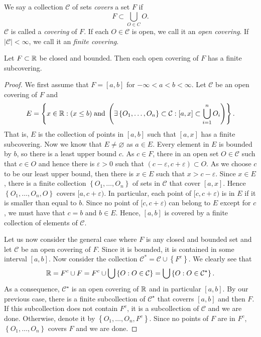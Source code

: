 \begin{definition}[]
	We say a collection $\mathcal C$ of sets \emph{covers} a set $F$ if
	\[
		F \subset \bigcup_{O \in C} O.
	\]
	$\mathcal C$ is called a \emph{covering} of $F$.
	If each $O \in \mathcal C$ is open, we call it an \emph{open covering}.
	If $\left\lvert \mathcal C \right\rvert < \infty$, we call it an 
	\emph{finite covering}.
\end{definition}

\begin{theorem}
	Let $F \subset \mathbb{R}$ be closed and bounded.
	Then each open covering of $F$ has a finite subcovering.
\end{theorem}

\begin{proof}
	We first assume that $F = [a,b]$
	for $-\infty < a < b < \infty$.
	Let $\mathcal C$ be an open covering of $F$ and
	\[
		E = \left\{
			x \in \mathbb{R}:
			(x \leq b)
			\;\text{and}\;
			\left(\exists\left\{ O_1, \ldots, O_n \right\} \subset \mathcal C:
			[a,x] \subset \bigcup_{i=1}^n O_i\right)
		\right\}.
	\]
	That is, $E$ is the collection of points in $[a,b]$
	such that $[a,x]$ has a finite subcovering.
	Now we know that $E \neq \varnothing$ as $a \in E$.
	Every element in $E$ is bounded by $b$, so there is a least
	upper bound $c$.
	As $c \in F$, there in an open set $O \in \mathcal C$ such that $c \in O$
	and hence there is $\varepsilon > 0$ such that 
	$(c - \varepsilon, c + \varepsilon) \subset O$.
	As we choose $c$ to be our least upper bound, then there is $x \in E$
	such that $x > c - \varepsilon$.
	Since $x \in E$, there is a finite collection
	$ \left\{ O_1, \ldots, O_n \right\} $
	of sets in $\mathcal C$ that cover $[a,x]$.
	Hence
	$ \left\{ O_1, \ldots, O_n, O \right\} $
	covers $[a, c + \varepsilon)$.
	In particular, each point of $[c, c + \varepsilon)$
	is in $E$ if it is smaller than equal to $b$. 
	Since no point of $[c, c + \varepsilon)$ can belong to $E$
	except for $c$, we must have that $c = b$ and $b \in E$.
	Hence, $[a,b]$ is covered by a finite collection of elements of 
	$\mathcal C$.

	Let us now consider the general case where $F$ is any
	closed and bounded set and let $\mathcal C$ be an open covering of $F$.
	Since it is bounded, it is contained in some interval $[a,b]$.
	Now consider the collection 
	$\mathcal C^* = \mathcal C \cup \left\{ F^c \right\}$.
	We clearly see that
	\[
		\mathbb{R} 
		= F^c \cup F 
		= F^c \cup \bigcup \left\{ O: O \in \mathcal C \right\}
		= \bigcup \left\{ O : O \in \mathcal C^\star \right\}.
	\]
	As a consequence, $\mathcal C^\star$ is an open covering of $\mathbb{R}$
	and in particular $[a,b]$.
	By our previous case, there is a finite subcollection of $\mathcal C^\star$
	that coverrs $[a,b]$ and then $F$.
	If this subcollection does not contain $F^c$, it is a subcollection of 
	$\mathcal C$ and we are done.
	Otherwise, denote it by 
	$ \left\{ O_1, \ldots, O_n, F^c \right\} $.
	Since no points of $F$ are in $F^c$, 
	$ \left\{ O_1, \ldots, O_n \right\} $ covers $F$ and we are done.
\end{proof}


